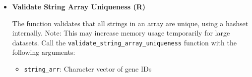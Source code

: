 \begin{enumerate}
\begin{itemize}
                  The function validates shift vectors, ensuring data types are correct and
                  structure matches expected patterns. Shift vectors represent the deviation
                  of each gene from its family centroid. Call the \texttt{validate\_shift\_vectors}
                  function with the following arguments:
                  
                  \begin{itemize}
                    \item \texttt{shift\_vectors}: Numeric matrix of shift vectors (2*n\_samples
                          × n\_genes)
                          
                    \item \texttt{expression\_vectors}: Numeric matrix of expression values (n\_samples
                          × n\_genes)
                          
                    \item \texttt{family\_centroids}: Numeric matrix of family centroids (n\_samples
                          × n\_families)
                          
                    \item \texttt{gene\_to\_fam}: Integer vector mapping each gene to its family
                          index
                          
                    \item \texttt{n\_samples}: Number of samples
                  \end{itemize}
                  
                  \begin{lstlisting}[language=R, caption={R Validate Shift Vectors}]
validate_shift_vectors(shift_vectors, expression_vectors, 
    family_centroids, gene_to_fam, n_samples)
                  \end{lstlisting}
                  
            \item \textbf{Validate String Array Uniqueness (R)}
                  
                  The function validates that all strings in an array are unique, using a
                  hashset internally. Note: This may increase memory usage temporarily for
                  large datasets. Call the \texttt{validate\_string\_array\_uniqueness}
                  function with the following arguments:
                  
                  \begin{itemize}
                    \item \texttt{string\_arr}: Character vector of gene IDs
                          

\end{itemize}
\end{itemize}
\end{enumerate}
